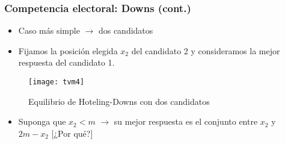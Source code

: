 \documentclass[14pt,aspectratio=169]{beamer}
\begin{document}
\begin{frame}
\frametitle{Competencia electoral: Downs (cont.)}
\begin{itemize}
\item Caso más simple $\longrightarrow$ dos candidatos
\item Fijamos la posición elegida $x_{2}$ del candidato 2 y
  consideramos la mejor respuesta del candidato 1. \medskip
\end{itemize}
\begin{figure}[htbp] \vspace{-2cm}
  \centering
  \texttt{[image: tvm4]} \vspace{-3cm}
  \caption{Equilibrio de Hoteling-Downs con dos candidatos}
  \label{fig:3}
\end{figure}

\begin{itemize}\itemsep 10pt
\item Suponga que $x_{2}<m$ $\longrightarrow$ su mejor respuesta es el
  conjunto entre $x_{2}$ y $2m-x_{2}$ [¿Por qué?]
\end{itemize}
\end{frame}
\end{document}
